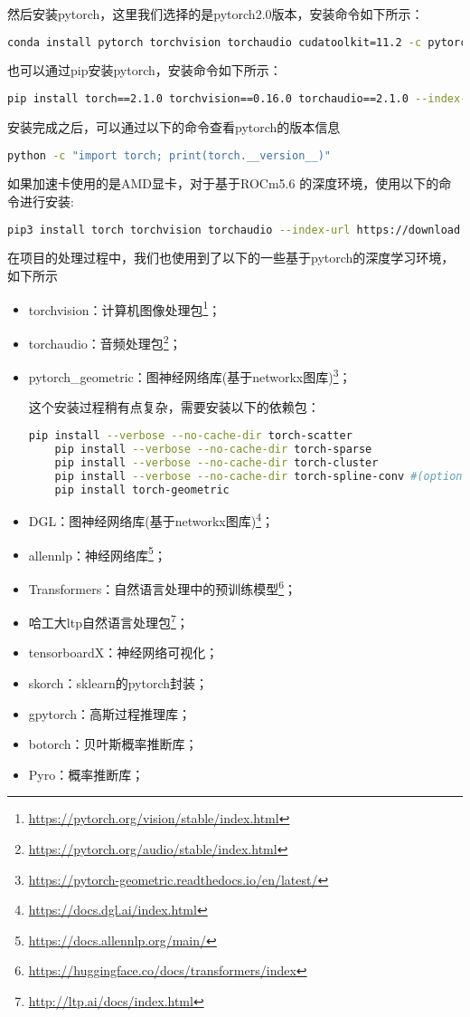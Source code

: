 \documentclass[lang=cn,a4paper,newtx]{elegantpaper}
\begin{document}
然后安装pytorch，这里我们选择的是pytorch2.0版本，安装命令如下所示：
\begin{lstlisting}[language=bash]
conda install pytorch torchvision torchaudio cudatoolkit=11.2 -c pytorch -c nvidia
\end{lstlisting}

也可以通过pip安装pytorch，安装命令如下所示：

\begin{lstlisting}[language=bash]
  pip install torch==2.1.0 torchvision==0.16.0 torchaudio==2.1.0 --index-url https://download.pytorch.org/whl/cu118
\end{lstlisting}

安装完成之后，可以通过以下的命令查看pytorch的版本信息
\begin{lstlisting}[language=bash]
python -c "import torch; print(torch.__version__)"
\end{lstlisting}

如果加速卡使用的是AMD显卡，对于基于ROCm5.6 的深度环境，使用以下的命令进行安装:
\begin{lstlisting}[language=bash]
  pip3 install torch torchvision torchaudio --index-url https://download.pytorch.org/whl/rocm5.6
\end{lstlisting}

在项目的处理过程中，我们也使用到了以下的一些基于pytorch的深度学习环境，如下所示
\begin{itemize}
  \item torchvision：计算机图像处理包\footnote{\url{https://pytorch.org/vision/stable/index.html}}；
  \item torchaudio：音频处理包\footnote{\url{https://pytorch.org/audio/stable/index.html}}；
  \item pytorch\_geometric：图神经网络库(基于networkx图库)\footnote{\url{https://pytorch-geometric.readthedocs.io/en/latest/}}；
  
  这个安装过程稍有点复杂，需要安装以下的依赖包：
  \begin{lstlisting}[language=bash]
    pip install --verbose --no-cache-dir torch-scatter
    pip install --verbose --no-cache-dir torch-sparse
    pip install --verbose --no-cache-dir torch-cluster
    pip install --verbose --no-cache-dir torch-spline-conv #(optional)
    pip install torch-geometric
  \end{lstlisting}
  \item DGL：图神经网络库(基于networkx图库)\footnote{\url{https://docs.dgl.ai/index.html}}；
  \item allennlp：神经网络库\footnote{\url{https://docs.allennlp.org/main/}}；
  \item Transformers：自然语言处理中的预训练模型\footnote{\url{https://huggingface.co/docs/transformers/index}}；
  \item 哈工大ltp自然语言处理包\footnote{\url{http://ltp.ai/docs/index.html}}；
  \item tensorboardX：神经网络可视化；
  \item skorch：sklearn的pytorch封装；
  \item gpytorch：高斯过程推理库；
  \item botorch：贝叶斯概率推断库；
  \item Pyro：概率推断库；
\end{itemize}
\end{document}
